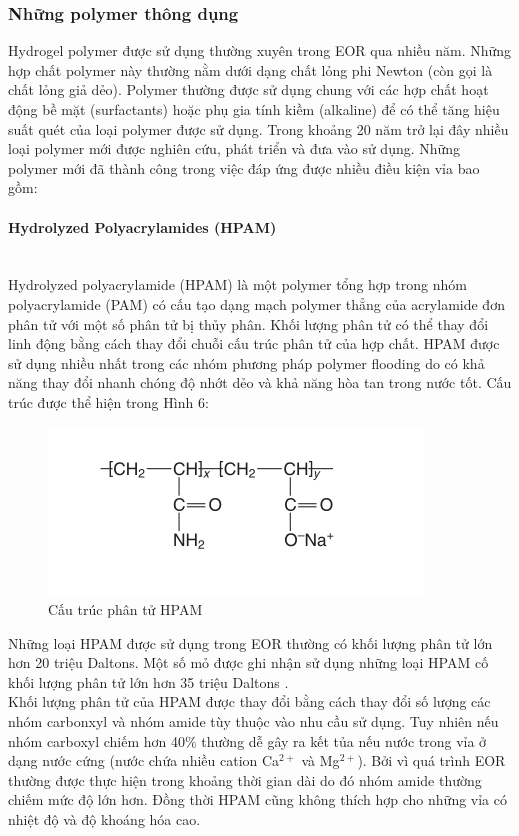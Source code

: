 \documentclass[12pt,a4paper]{article}
\newcommand{\subsubsubsection}[1]{\paragraph{#1}\mbox{}\\}
\begin{document}
	\subsubsection{Những polymer thông dụng}
	Hydrogel polymer được sử dụng thường xuyên trong EOR qua nhiều năm. Những hợp chất polymer này thường nằm dưới dạng chất lỏng phi Newton (còn gọi là chất lỏng giả dẻo). Polymer thường được sử dụng chung với các hợp chất hoạt động bề mặt (surfactants) hoặc phụ gia tính kiềm (alkaline) để có thể tăng hiệu suất quét của loại polymer được sử dụng. Trong khoảng 20 năm trở lại đây nhiều loại polymer mới được nghiên cứu, phát triển và đưa vào sử dụng. Những polymer mới đã thành công trong việc đáp ứng được nhiều điều kiện vỉa bao gồm:
	\subsubsubsection{Hydrolyzed Polyacrylamides (HPAM)}
	Hydrolyzed polyacrylamide (HPAM) là một polymer tổng hợp trong nhóm polyacrylamide (PAM) có cấu tạo dạng mạch polymer thẳng của acrylamide đơn phân tử với một số phân tử bị thủy phân. Khối lượng phân tử có thể thay đổi linh động bằng cách thay đổi chuỗi cấu trúc phân tử của hợp chất. HPAM được sử dụng nhiều nhất trong các nhóm phương pháp polymer flooding do có khả năng thay đổi nhanh chóng độ nhớt dẻo và khả năng hòa tan trong nước tốt. Cấu trúc  được thể hiện trong Hình 6:
	\begin{figure}[h]
		\centering
		\includegraphics[scale=1]{Fig/HPAM.PNG}
		\caption{Cấu trúc phân tử HPAM \cite{sheng2010modern}}
	\end{figure}
	\newline
	Những loại HPAM được sử dụng trong EOR thường có khối lượng phân tử lớn hơn 20 triệu Daltons. Một số mỏ được ghi nhận sử dụng những loại HPAM cố khối lượng phân tử lớn hơn 35 triệu Daltons \cite{sheng2010modern}.\\
	Khối lượng phân tử của HPAM được thay đổi bằng cách thay đổi số lượng các nhóm carbonxyl và nhóm amide tùy thuộc vào nhu cầu sử dụng. Tuy nhiên nếu nhóm carboxyl chiếm hơn 40$\%$ thường dễ gây ra kết tủa nếu nước trong vỉa ở dạng nước cứng (nước chứa nhiều cation Ca$^{2+}$ và Mg$^{2+}$). Bởi vì quá trình EOR thường được thực hiện trong khoảng thời gian dài do đó nhóm amide thường chiếm mức độ lớn hơn. Đồng thời HPAM cũng không thích hợp cho những vỉa có nhiệt độ và độ khoáng hóa cao. 
\end{document}
